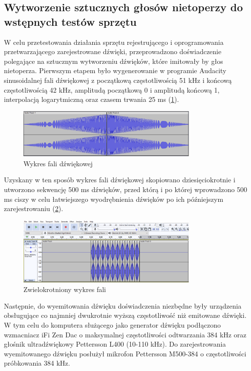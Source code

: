\documentclass{sprz}
\begin{document}
\subsection{Wytworzenie sztucznych głosów nietoperzy do wstępnych testów sprzętu}

W celu przetestowania działania sprzętu rejestrującego i oprogramowania przetwarzającego zarejestrowane dźwięki, przeprowadzono doświadczenie polegające na sztucznym wytworzeniu dźwięków, które imitowały by głos nietoperza.
Pierwszym etapem było wygenerowanie w programie Audacity sinusoidalnej fali dźwiękowej z początkową częstotliwością 51 kHz i końcową częstotliwością 42 kHz, amplitudą początkową 0 i amplitudą końcową 1, interpolacją logarytmiczną oraz czasem trwania 25 ms (\ref{img:wykres_fali}).

\begin{figure}[h]
    \centering
    \includegraphics[width=0.8\textwidth]{sprz/wykres_fali}
    \caption{Wykres fali dźwiękowej}
    \label{img:wykres_fali}
\end{figure}

Uzyskany w ten sposób wykres fali dźwiękowej skopiowano dziesięciokrotnie i utworzono sekwencję 500 ms dźwięków, przed którą i po której wprowadzono 500 ms ciszy w celu łatwiejszego wyodrębnienia dźwięków po ich późniejszym zarejestrowaniu (\ref{img:wykres_fali_wielokrotnej}).

\begin{figure}[h]
    \centering
    \includegraphics[width=0.8\textwidth]{sprz/wykres_fali_wielokrotnej}
    \caption{Zwielokrotniony wykres fali}
    \label{img:wykres_fali_wielokrotnej}
\end{figure}

Następnie, do wyemitowania dźwięku doświadczenia niezbędne były urządzenia obsługujące co najmniej dwukrotnie wyższą częstotliwość niż emitowane dźwięki. W tym celu do komputera służącego jako generator dźwięku podłączono wzmacniacz iFi Zen Dac o maksymalnej częstotliwości odtwarzania 384 kHz oraz głośnik ultradźwiękowy Pettersson L400 (10-110 kHz). Do zarejestrowania wyemitowanego dźwięku posłużył mikrofon Pettersson M500-384 o częstotliwości próbkowania 384 kHz.
\end{document}
